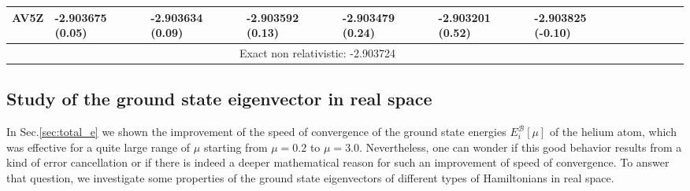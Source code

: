 \documentclass[aip,jcp,reprint,noshowkeys,superscriptaddress]{revtex4-1}
\newcommand{\basis}[0]{\mathcal{B}}
\begin{document}
\begin{table}
\begin{ruledtabular}
\begin{tabular}{llllllllllll}
 AV5Z        &    -2.903675 (0.05)   &    -2.903634 (0.09)   &    -2.903592 (0.13)   &    -2.903479 (0.24)  &    -2.903201 (0.52)  &    -2.903825 (-0.10)\\
\hline                                                                                                                                                   
\multicolumn{7}{c}{Exact non relativistic: -2.903724}   \\
\end{tabular}
\end{ruledtabular}
\end{table}

\subsection{Study of the ground state eigenvector in real space}
In Sec.\ref{sec:total_e} we shown the improvement of the speed of convergence of the ground state energies $E_i^{\basis}[\mu]$ of the helium atom, which was effective for a quite large range of $\mu$ starting from $\mu=0.2$ to $\mu=3.0$. 
Nevertheless, one can wonder if this good behavior results from a kind of error cancellation or if there is indeed a deeper mathematical reason for such an improvement of speed of convergence. 
To answer that question, we investigate some properties of the ground state eigenvectors of different types of Hamiltonians in real space. 
\end{document}
